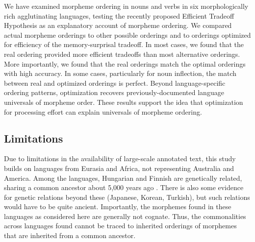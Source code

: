 \documentclass[11pt,letterpaper]{article}
\newcommand{\citep}{\parencite}
\newcommand\becky[1]{{\color{blue}(#1)}}
\begin{document}
We have examined morpheme ordering in nouns and verbs in six morphologically rich agglutinating languages, testing the recently proposed Efficient Tradeoff Hypothesis \citep{Hahn2020modeling} as an explanatory account of morpheme ordering.
We compared actual morpheme orderings to other possible orderings and to orderings optimized for efficiency of the memory-surprisal tradeoff.
In most cases, we found that the real ordering provided more efficient tradeoffs than most alternative orderings.
More importantly, we found that the real orderings match the optimal orderings with high accuracy.
In some cases, particularly for noun inflection, the match between real and optimized orderings is perfect.
Beyond language-specific ordering patterns, optimization recovers previously-documented language universals of morpheme order.
These results support the idea that optimization for processing effort can explain universals of morpheme ordering.





\subsection{Limitations}

Due to limitations in the availability of large-scale annotated text, this study builds on languages from Eurasia and Africa, not representing Australia and America.
Among the languages, Hungarian and Finnish are genetically related, sharing a common ancestor about 5,000 years ago \citep{maurits2020best}.
There is also some evidence for genetic relations beyond these (Japanese, Korean, Turkish), but such relations would have to be quite ancient.
Importantly, the morphemes found in these languages as considered here are generally not cognate.
Thus, the commonalities across languages found cannot be traced to inherited orderings of morphemes that are inherited from a common ancestor.


\end{document}
